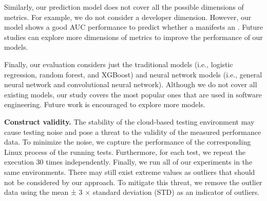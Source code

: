 Similarly, our prediction model does not cover all the possible dimensions of metrics. For example, we do not consider a developer dimension. However, our model shows a good AUC performance to predict whether a \instance manifests an \inconsistent. Future studies can explore more dimensions of metrics to improve the performance of our models. 

Finally, our evaluation considers just the traditional models (i.e., logistic regression, random forest, and XGBoost) and neural network models (i.e., general neural network and convolutional neural network). Although we do not cover all existing models, our study covers the most popular ones that are used in software engineering. Future work is encouraged to explore more models. 




\noindent \textbf{Construct validity.} %
The stability of the cloud-based testing environment may cause testing noise and pose a threat to the validity of the measured performance data. To minimize the noise, we capture the performance of the corresponding Linux process of the running tests. Furthermore, for each test, we repeat the execution 30 times independently. Finally, we run all of our experiments in the same environments. There may still exist extreme values as outliers that should not be considered by our approach. To mitigate this threat, we remove the outlier data using the mean ± 3 × standard deviation (STD) as an indicator of outliers.
